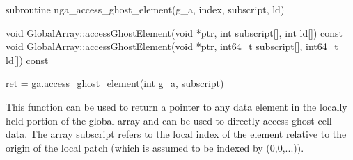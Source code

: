 \documentclass[10pt]{article}
\begin{document}
\begin{fapi}
\begin{fcode}
subroutine nga_access_ghost_element(g_a, index, subscript, ld)
\end{fcode}
\begin{funcargs}
\end{funcargs}
\end{fapi}

\begin{cxxapi}
\begin{cxxcode}
void GlobalArray::accessGhostElement(void *ptr, int subscript[],
                                     int ld[]) const
void GlobalArray::accessGhostElement(void *ptr, int64_t subscript[],
                                     int64_t ld[]) const
\end{cxxcode}
\begin{funcargs}
\end{funcargs}
\end{cxxapi}

\begin{pyapi}
\begin{pycode}
ret = ga.access_ghost_element(int g_a, subscript)
\end{pycode}
\begin{funcargs}
\end{funcargs}
\end{pyapi}

\local

\begin{desc}

This function can be used to return a pointer to any data element in the
locally held portion of the global array and can be used to directly access
ghost cell data. The array subscript refers to the local index of the element
relative to the origin of the local patch (which is assumed to be indexed by
(0,0,...)).

\end{desc}
\end{document}
